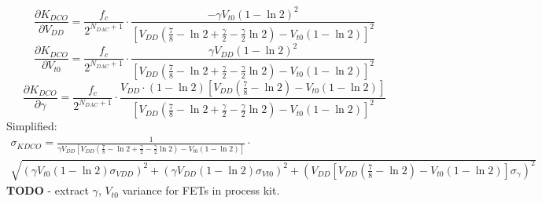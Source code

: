 \documentclass[10pt,a4paper]{article}
\begin{document}
	\begin{equation}
		\frac{\partial K_{DCO}}{\partial V_{DD}} = \frac{f_c}{2^{N_{DAC}+1}}\cdot\frac{-\gamma V_{t0}(1-\ln2)^2}{\left[ V_{DD}\left(\frac{7}{8}-\ln2+\frac{\gamma}{2}-\frac{\gamma}{2}\ln2\right)-V_{t0}\left(1-\ln2\right) \right]^2}
	\end{equation}
	\begin{equation}
		\frac{\partial K_{DCO}}{\partial V_{t0}} = \frac{f_c}{2^{N_{DAC}+1}}\cdot\frac{\gamma V_{DD}(1-\ln2)^2}{\left[ V_{DD}\left(\frac{7}{8}-\ln2+\frac{\gamma}{2}-\frac{\gamma}{2}\ln2\right)-V_{t0}\left(1-\ln2\right) \right]^2}
	\end{equation}
	\begin{equation}
		\frac{\partial K_{DCO}}{\partial \gamma} = \frac{f_c}{2^{N_{DAC}+1}}\cdot\frac{V_{DD}\cdot(1-\ln2) \left[ V_{DD}\left(\frac{7}{8}-\ln2\right)-V_{t0}\left(1-\ln2\right) \right]}{\left[ V_{DD}\left(\frac{7}{8}-\ln2+\frac{\gamma}{2}-\frac{\gamma}{2}\ln2\right)-V_{t0}\left(1-\ln2\right) \right]^2}
	\end{equation}
	Simplified:
	\begin{multline}
		\sigma_{KDCO} = \frac{1}{\gamma V_{DD} \left[ V_{DD}\left(\frac{7}{8}-\ln2+\frac{\gamma}{2}-\frac{\gamma}{2}\ln2\right)-V_{t0}\left(1-\ln2\right) \right]}\cdot\\ \sqrt{\left(\gamma V_{t0} (1-\ln2)\sigma_{VDD} \right)^2 + \left(\gamma V_{DD} (1-\ln2)\sigma_{Vt0} \right)^2 + \left( V_{DD}\left[ V_{DD}\left(\frac{7}{8}-\ln2\right)-V_{t0}\left(1-\ln2\right) \right]\sigma_{\gamma} \right)^2 }
	\end{multline}		
	\textbf{TODO} - extract $\gamma$, $V_{t0}$ variance for FETs in process kit.



    \pagebreak

	\printbibliography


	\pagebreak
	\appendix
\end{document}
